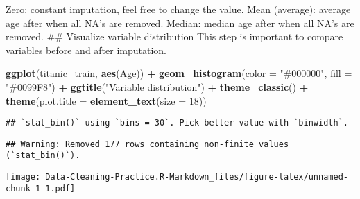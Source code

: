 \documentclass[
]{article}
\newenvironment{Shaded}{\begin{snugshade}}{\end{snugshade}}
\newcommand{\AttributeTok}[1]{\textcolor[rgb]{0.13,0.29,0.53}{#1}}
\newcommand{\ConstantTok}[1]{\textcolor[rgb]{0.56,0.35,0.01}{#1}}
\newcommand{\DecValTok}[1]{\textcolor[rgb]{0.00,0.00,0.81}{#1}}
\newcommand{\FunctionTok}[1]{\textcolor[rgb]{0.13,0.29,0.53}{\textbf{#1}}}
\newcommand{\NormalTok}[1]{#1}
\newcommand{\OtherTok}[1]{\textcolor[rgb]{0.56,0.35,0.01}{#1}}
\newcommand{\SpecialCharTok}[1]{\textcolor[rgb]{0.81,0.36,0.00}{\textbf{#1}}}
\newcommand{\StringTok}[1]{\textcolor[rgb]{0.31,0.60,0.02}{#1}}
\begin{document}
Zero: constant imputation, feel free to change the value. Mean
(average): average age after when all NA's are removed. Median: median
age after when all NA's are removed. \#\# Visualize variable
distribution This step is important to compare variables before and
after imputation.

\begin{Shaded}
\begin{Highlighting}[]
\FunctionTok{ggplot}\NormalTok{(titanic\_train, }\FunctionTok{aes}\NormalTok{(Age)) }\SpecialCharTok{+}
  \FunctionTok{geom\_histogram}\NormalTok{(}\AttributeTok{color =} \StringTok{"\#000000"}\NormalTok{, }\AttributeTok{fill =} \StringTok{"\#0099F8"}\NormalTok{) }\SpecialCharTok{+}
  \FunctionTok{ggtitle}\NormalTok{(}\StringTok{"Variable distribution"}\NormalTok{) }\SpecialCharTok{+}
  \FunctionTok{theme\_classic}\NormalTok{() }\SpecialCharTok{+}
  \FunctionTok{theme}\NormalTok{(}\AttributeTok{plot.title =} \FunctionTok{element\_text}\NormalTok{(}\AttributeTok{size =} \DecValTok{18}\NormalTok{))}
\end{Highlighting}
\end{Shaded}

\begin{verbatim}
## `stat_bin()` using `bins = 30`. Pick better value with `binwidth`.
\end{verbatim}

\begin{verbatim}
## Warning: Removed 177 rows containing non-finite values (`stat_bin()`).
\end{verbatim}

\texttt{[image: Data-Cleaning-Practice.R-Markdown\_files/figure-latex/unnamed-chunk-1-1.pdf]}

\begin{Shaded}
\end{Shaded}
\end{document}
